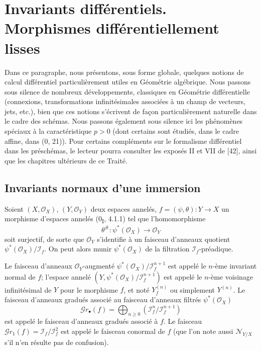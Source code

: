 \section{Invariants différentiels. Morphismes différentiellement lisses}
\label{section:IV.16}

Dans ce paragraphe, nous présentons, sous forme globale, quelques notions de
calcul différentiel particulièrement utiles en Géométrie algébrique. Nous passons sous
silence de nombreux développements, classiques en Géométrie différentielle (connexions,
transformations infinitésimales associées à un champ de vecteurs, jets, etc.), bien que ces
notions s'écrivent de façon particulièrement naturelle dans le cadre des schémas. Nous
passons également sous silence ici les phénomènes spéciaux à la caractéristique $p>0$
(dont certains sont étudiés, dans le cadre affine, dans (0, 21)). Pour certains compléments
sur le formalisme différentiel dans les préschémas, le lecteur pourra consulter les
exposés II et VII de [42], ainsi que les chapitres ultérieurs de ce Traité.

\subsection{Invariants normaux d'une immersion}
\label{IV.16.1}

\begin{env}[16.1.1]
\label{IV.16.1.1}
Soient $(X,\mathcal{O}_X)$, $(Y,\mathcal{O}_Y)$ deux espaces annelés,
$f=(\psi,\theta):Y\to X$ un morphisme d'espaces annelés (0\textsubscript{I}, 4.1.1)
tel que l'homomorphisme
\[
  \theta^\#:\psi^*(\mathcal{O}_X)\longrightarrow\mathcal{O}_Y
\]
soit surjectif, de sorte que $\mathcal{O}_Y$ s'identifie à un faisceau d'anneaux quotient
$\psi^*(\mathcal{O}_X)/\mathscr{I}_f$. On peut alors munir
$\psi^*(\mathcal{O}_X)$ de la filtration $\mathscr{I}_f$-préadique.
\end{env}

\begin{definition}[16.1.2]
\label{IV.16.1.2}
Le faisceau d'anneaux $\mathcal{O}_Y$-augmenté
$\psi^*(\mathcal{O}_X)/\mathscr{I}_f^{n+1}$ est appelé le $n$-ème invariant normal
de $f$; l'espace annelé
$(Y,\psi^*(\mathcal{O}_X)/\mathscr{I}_f^{n+1})$ est appelé le $n$-ème voisinage
infinitésimal de $Y$ pour le morphisme $f$, et noté $Y_f^{(n)}$ ou simplement
$Y^{(n)}$. Le faisceau d'anneaux gradués associé au faisceau d'anneaux filtrés
$\psi^*(\mathcal{O}_X)$
\[
  \mathscr{G}r_\bullet(f)=\bigoplus_{n\geq 0}
  (\mathscr{I}_f^n/\mathscr{I}_f^{n+1})
  \tag{16.1.2.1}
  \label{IV.16.1.2.1}
\]
est appelé le faisceau d'anneaux gradués associé à $f$. Le faisceau
$\mathscr{G}r_1(f)=\mathscr{I}_f/\mathscr{I}_f^2$ est appelé le faisceau conormal
de $f$ (que l'on note aussi $\mathscr{N}_{Y/X}$ s'il n'en résulte pas de confusion).
\end{definition}

